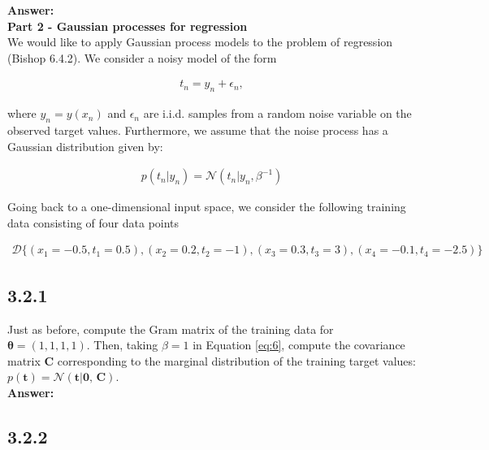 \documentclass[a4paper]{article}
\begin{document}
\textbf{Answer:}\\








\textbf{Part 2 - Gaussian processes for regression}\\

We would like to apply Gaussian process models to the problem of regression (Bishop 6.4.2). We consider a noisy model of the form 

\begin{align*}
t_n = y_n + \epsilon_n,
\end{align*}

where $y_n = y(x_n)$ and $\epsilon_n$ are i.i.d. samples from a random noise variable on the observed target values. Furthermore, we assume that the noise process has a Gaussian distribution given by:

\begin{eqnarray} \label{eq:6}
p(t_n | y_n) = \mathcal{N}(t_n | y_n, \beta^{-1})
\end{eqnarray}

Going back to a one-dimensional input space, we consider the following training data consisting of four data points 

\begin{align*}
\mathcal{D} \{ (x_1 = -0.5, t_1 = 0.5), (x_2 = 0.2, t_2 = -1), (x_3 = 0.3, t_3 = 3),(x_4 = -0.1, t_4 = -2.5) \}
\end{align*}


\subsection*{3.2.1}

Just as before, compute the Gram matrix of the training data for $\boldsymbol{\theta} = (1,1,1,1)$. Then, taking $\beta = 1$ in Equation \ref{eq:6}, compute the covariance matrix \textbf{C} corresponding to the marginal distribution of the training target values: $p(\textbf{t}) = \mathcal{N}(\textbf{t} | \textbf{0, C})$.\\

\textbf{Answer:}\\






\subsection*{3.2.2}
\end{document}
